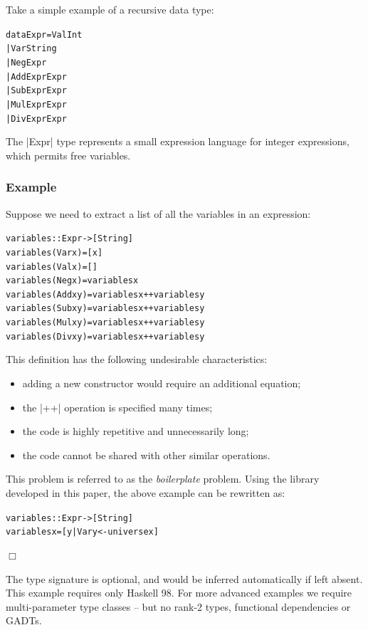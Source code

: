\documentclass[preprint]{sigplanconf}
\newcounter{exmp}
\newcommand{\yesexample}{\subsubsection*{Example \arabic{exmp}}\refstepcounter{exmp}}
\newcommand{\noexample}{\hfill$\Box$}
\newenvironment{code}{\begin{alltt}\small}{\end{alltt}}
\newenvironment{example}{\yesexample}{\noexample}
\begin{document}
Take a simple example of a recursive data type:

\begin{code}
data Expr  =  Val  Int
           |  Var  String
           |  Neg  Expr
           |  Add  Expr  Expr
           |  Sub  Expr  Expr
           |  Mul  Expr  Expr
           |  Div  Expr  Expr
\end{code}

The |Expr| type represents a small expression language for integer expressions, which permits free variables.

\begin{example}
\label{ex:variables}

Suppose we need to extract a list of all the variables in an expression:

\begin{code}
variables :: Expr -> [String]
variables (Var  x    ) = [x]
variables (Val  x    ) = []
variables (Neg  x    ) = variables x
variables (Add  x y  ) = variables x ++ variables y
variables (Sub  x y  ) = variables x ++ variables y
variables (Mul  x y  ) = variables x ++ variables y
variables (Div  x y  ) = variables x ++ variables y
\end{code}

This definition has the following undesirable characteristics:

\begin{itemize}
\item adding a new constructor would require an additional equation;
\item the |++| operation is specified many times;
\item the code is highly repetitive and unnecessarily long;
\item the code cannot be shared with other similar operations.
\end{itemize}

This problem is referred to as the \textit{boilerplate} problem. Using the library developed in this paper, the above example can be rewritten as:

\begin{code}
variables :: Expr -> [String]
variables x = [y | Var y <- universe x]
\end{code}
\end{example}

The type signature is optional, and would be inferred automatically if left absent. This example requires only Haskell 98. For more advanced examples we require multi-parameter type classes -- but no rank-2 types, functional dependencies or GADTs.
\end{document}

